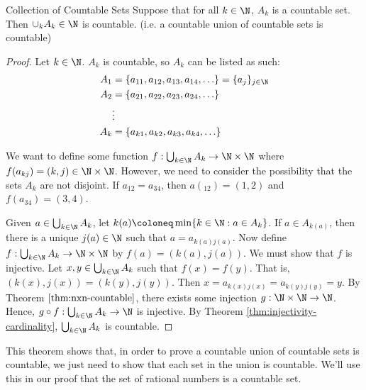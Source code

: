 \begin{thmbox}{Collection of Countable Sets}{}
    Suppose that for all $k \in \N$, $A_k$ is a countable set. Then $\cup_k A_k \in \N$ is countable. (i.e. a countable union of countable sets is countable)
    \tcblower
    \begin{proof}
        Let $k \in \N$. $A_k$ is countable, so $A_k$ can be listed as such:
        \begin{align*}
            A_1 &= \{a_{11}, a_{12}, a_{13}, a_{14}, \ldots\} = \{a_j\}_{j \in \N} \\
            A_2 &= \{a_{21}, a_{22}, a_{23}, a_{24}, \ldots\} \\
            &\vdots \\
            A_k &= \{a_{k1}, a_{k2}, a_{k3}, a_{k4}, \ldots\}
        \end{align*}

        \begin{notebox}
            We want to define some function $f : \bigcup_{k \in \N}A_k \to \N \times \N$ where $f(a_{kj}) = (k,j) \in \N \times \N$.
            However, we need to consider the possibility that the sets $A_k$ are not disjoint. If $a_{12} = a_{34}$, then $a(_{12}) = (1,2)$ and $f(a_{34}) = (3,4)$.
        \end{notebox}
        Given $a \in \bigcup_{k \in \N}A_k$, let $k(a) \coloneq \min\{ k \in \N : a \in A_k \}$. If $a \in A_{k(a)}$, then there is a unique $j(a) \in \N$ such that $a = a_{k(a)j(a)}$. Now define $f : \bigcup_{k \in \N} A_k \to \N \times \N$ by $f(a) = (k(a), j(a))$. We must show that $f$ is injective. Let $x,y \in \bigcup_{k \in \N}A_k$ such that $f(x) = f(y)$. That is, $(k(x),j(x)) = (k(y),j(y))$. Then $x = a_{k(x)j(x)} = a_{k(y)j(y)} = y$. By Theorem $\ref{thm:nxn-countable}$, there exists some injection $g : \N \times \N \to \N$. Hence, $g \circ f : \bigcup_{k \in \N}A_k \to \N$ is injective. By Theorem \ref{thm:injectivity-cardinality}, $\bigcup_{k \in \N} A_k$ is countable.
    \end{proof}
\end{thmbox}

This theorem shows that, in order to prove a countable union of countable sets is countable, we just need to show that each set in the union is countable. We'll use this in our proof that the set of rational numbers is a countable set.

